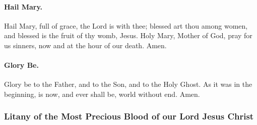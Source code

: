 \documentclass{article}
\begin{document}
\begin{multicols}{3}
\paragraph{Hail Mary.}  Hail Mary, full of grace, the Lord is with thee;
blessed art thou among women, and blessed is the fruit of
thy womb, Jesus.  Holy Mary, Mother of God, pray for us sinners,
now and at the hour of our death. Amen.

\paragraph{Glory Be.}  Glory be to the Father, and to the Son, and to the Holy Ghost. As it was in the beginning, is now, and ever shall be, world without end. Amen.

\begin{FlushLeft}
\subsubsection*{Litany of the Most Precious Blood of our Lord Jesus Christ}


\end{FlushLeft}
\end{multicols}
\end{document}
